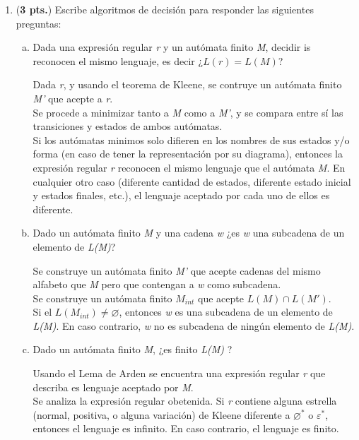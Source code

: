 \documentclass{article}
\begin{document}
\begin{enumerate}
\begin{enumerate}[a)]
      \end{enumerate}
    \item (\textbf{3 pts.}) Escribe algoritmos de decisión para responder las siguientes preguntas:
      \begin{enumerate} [a)]
      \item Dada una expresión regular \textit r y un autómata finito \textit M, decidir is reconocen el mismo lenguaje, es decir ¿$L(r) = L(M)$?

        Dada \textit r, y usando el teorema de Kleene, se contruye un autómata finito \textit{M'} que acepte a \textit r. \\
        Se procede a minimizar tanto a \textit M como a \textit{M'}, y se compara entre sí las transiciones y estados de ambos autómatas.\\
        Si los autómatas minimos solo difieren en los nombres de sus estados y/o forma (en caso de tener la representación por su diagrama), entonces la expresión regular \textit r reconocen el mismo lenguaje que el autómata \textit M. En cualquier otro caso (diferente cantidad de estados, diferente estado inicial y estados finales, etc.), el lenguaje aceptado por cada uno de ellos es diferente.

      \item Dado un autómata finito \textit M y una cadena \textit w ¿es \textit w una subcadena de un elemento de \textit{L(M)}?

        Se construye un autómata finito \textit{M'} que acepte cadenas del mismo alfabeto que \textit M pero que contengan a \textit w como subcadena.\\
        Se construye un autómata finito $M_{int}$ que acepte $L(M) \cap L(M')$.\\
        Si el $L(M_{int}) \neq \varnothing$, entonces \textit w es una subcadena de un elemento de \textit{L(M)}. En caso contrario, \textit w no es subcadena de ningún elemento de \textit{L(M)}.

    \item Dado un autómata finito \textit M, ¿es finito \textit {L(M)} ?

      Usando el Lema de Arden se encuentra una expresión regular \textit r que describa es lenguaje aceptado por \textit M.\\
      Se analiza la expresión regular obetenida. Si \textit r contiene alguna estrella (normal, positiva, o alguna variación) de Kleene diferente a $\varnothing^*$ o $\varepsilon^*$, entonces el lenguaje es infinito. En caso contrario, el lenguaje es finito.
      \end{enumerate}
\end{enumerate}
\end{document}
